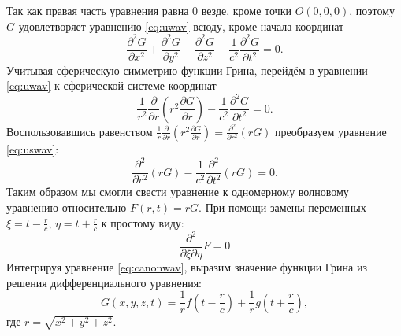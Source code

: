 \documentclass[a4paper, fontsize=14pt]{article}
\begin{document}
	Так как правая часть уравнения равна 0 везде, кроме точки $O(0,0,0)$, поэтому 
	$G$ удовлетворяет уравнению \ref{eq:uwav} всюду, кроме начала координат
	\begin{equation}
		\frac{\partial^2 G}{\partial x^2} + \frac{\partial^2 G}{\partial y^2} +
		\frac{\partial^2 G}{\partial z^2} - \frac{1}{c^2} \frac{\partial^2 G}{\partial
			t^2} = 0.
		\label{eq:uwav}
	\end{equation}
	Учитывая сферическую симметрию функции Грина, перейдём в уравнении \ref{eq:uwav} к сферической системе координат
	\begin{equation}
		\frac{1}{r^2}\frac{\partial}{\partial r}\left( r^2 \frac{\partial G}{\partial r} \right)- \frac{1}{c^2} \frac{\partial^2 G}{\partial
			t^2} = 0.
		\label{eq:uswav}
	\end{equation}
	Воспользовавшись равенством $\frac{1}{r}\frac{\partial}{\partial r}\left(r^2\frac{\partial G}{\partial r}\right) = \frac{\partial^2}{\partial r^2}\left(rG\right)$ преобразуем уравнение \ref{eq:uswav}:
	\begin{equation}
		\frac{\partial^2}{\partial r^2}\left( r  G\right)- \frac{1}{c^2} \frac{\partial^2 }{\partial
			t^2}\left(r G\right) = 0.
		\label{eq:uswav2}
	\end{equation}
	Таким образом мы смогли свести уравнение к одномерному волновому уравнению относительно $F(r,t) = rG$. При помощи замены переменных $\xi = t - \frac{r}{c}$, $\eta = t+\frac{r}{c}$ к простому виду:
	\begin{equation}
		\frac{\partial^2}{\partial \xi \partial \eta} F = 0	
		\label{eq:canonwav}
	\end{equation}
	Интегрируя уравнение \ref{eq:canonwav}, выразим значение функции Грина из решения дифференциального уравнения:
	\begin{equation}
		G(x,y,z,t) = \frac{1}{r}f\left(t-\frac{r}{c}\right) + \frac{1}{r} g\left(t+\frac{r}{c}\right),
		\label{eq:canonsol}
	\end{equation}
где $r = \sqrt{x^2+y^2+z^2}$.
\end{document}
